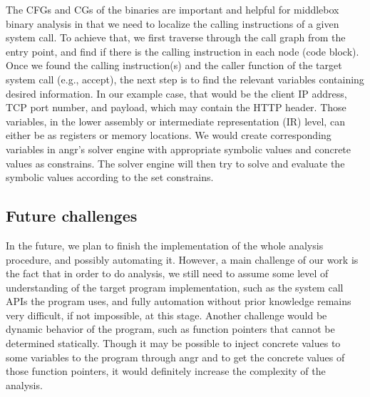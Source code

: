 The CFGs and CGs of the binaries are important and helpful for middlebox binary
analysis in that we need to localize the calling instructions of a given system
call. To achieve that, we first traverse through the call graph from the entry
point, and find if there is the calling instruction in each node (code block).
Once we found the calling instruction(s) and the caller function of the target
system call (e.g., accept), the next step is to find the relevant variables
containing desired information. In our example case, that would be the client IP
address, TCP port number, and payload, which may contain the HTTP header. Those
variables, in the lower assembly or intermediate representation (IR) level, can
either be as registers or memory locations. We would create corresponding
variables in angr's solver engine with appropriate symbolic values and concrete
values as constrains. The solver engine will then try to solve and evaluate the
symbolic values according to the set constrains.


\subsection{Future challenges}

In the future, we plan to finish the implementation of the whole analysis
procedure, and possibly automating it. However, a main challenge of our work is
the fact that in order to do analysis, we still need to assume some level of
understanding of the target program implementation, such as the system call APIs
the program uses, and fully automation without prior knowledge remains very
difficult, if not impossible, at this stage. Another challenge would be dynamic
behavior of the program, such as function pointers that cannot be determined
statically. Though it may be possible to inject concrete values to some
variables to the program through angr and to get the concrete values of those
function pointers, it would definitely increase the complexity of the analysis.


